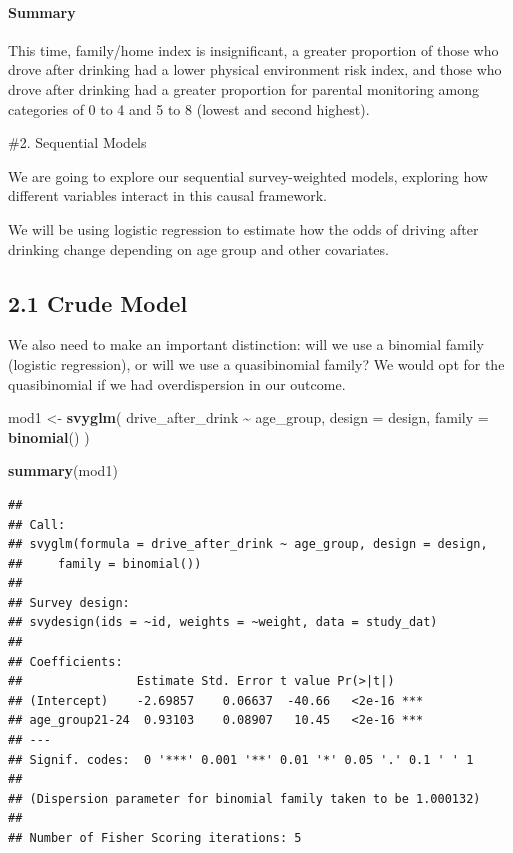 \documentclass[
]{article}
\newenvironment{Shaded}{\begin{snugshade}}{\end{snugshade}}
\newcommand{\AttributeTok}[1]{\textcolor[rgb]{0.13,0.29,0.53}{#1}}
\newcommand{\FunctionTok}[1]{\textcolor[rgb]{0.13,0.29,0.53}{\textbf{#1}}}
\newcommand{\NormalTok}[1]{#1}
\newcommand{\OtherTok}[1]{\textcolor[rgb]{0.56,0.35,0.01}{#1}}
\newcommand{\SpecialCharTok}[1]{\textcolor[rgb]{0.81,0.36,0.00}{\textbf{#1}}}
\begin{document}
\paragraph{Summary}\label{summary-2}

This time, family/home index is insignificant, a greater proportion of
those who drove after drinking had a lower physical environment risk
index, and those who drove after drinking had a greater proportion for
parental monitoring among categories of 0 to 4 and 5 to 8 (lowest and
second highest).

\#2. Sequential Models

We are going to explore our sequential survey-weighted models, exploring
how different variables interact in this causal framework.

We will be using logistic regression to estimate how the odds of driving
after drinking change depending on age group and other covariates.

\subsection{2.1 Crude Model}\label{crude-model}

We also need to make an important distinction: will we use a binomial
family (logistic regression), or will we use a quasibinomial family? We
would opt for the quasibinomial if we had overdispersion in our outcome.

\begin{Shaded}
\begin{Highlighting}[]
\NormalTok{mod1 }\OtherTok{\textless{}{-}} \FunctionTok{svyglm}\NormalTok{(}
\NormalTok{  drive\_after\_drink }\SpecialCharTok{\textasciitilde{}}\NormalTok{ age\_group,}
  \AttributeTok{design =}\NormalTok{ design,}
  \AttributeTok{family =} \FunctionTok{binomial}\NormalTok{()}
\NormalTok{) }

\FunctionTok{summary}\NormalTok{(mod1) }
\end{Highlighting}
\end{Shaded}

\begin{verbatim}
## 
## Call:
## svyglm(formula = drive_after_drink ~ age_group, design = design, 
##     family = binomial())
## 
## Survey design:
## svydesign(ids = ~id, weights = ~weight, data = study_dat)
## 
## Coefficients:
##                Estimate Std. Error t value Pr(>|t|)    
## (Intercept)    -2.69857    0.06637  -40.66   <2e-16 ***
## age_group21-24  0.93103    0.08907   10.45   <2e-16 ***
## ---
## Signif. codes:  0 '***' 0.001 '**' 0.01 '*' 0.05 '.' 0.1 ' ' 1
## 
## (Dispersion parameter for binomial family taken to be 1.000132)
## 
## Number of Fisher Scoring iterations: 5
\end{verbatim}
\end{document}
